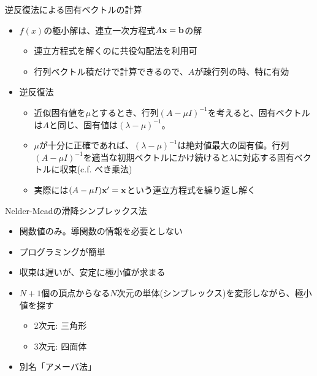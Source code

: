 \documentclass[dvipdfmx]{beamer}
\begin{document}
\begin{frame}[t,fragile]{逆反復法による固有ベクトルの計算}
  \begin{itemize}
    \setlength{\itemsep}{1em}
  \item $f(x)$の極小解は、連立一次方程式$A{\bf x} = {\bf b}$の解
    \begin{itemize}
    \item 連立方程式を解くのに共役勾配法を利用可
    \item 行列ベクトル積だけで計算できるので、$A$が疎行列の時、特に有効
    \end{itemize}
  \item 逆反復法
    \begin{itemize}
    \item 近似固有値を$\mu$とするとき、行列$(A - \mu I)^{-1}$を考えると、固有ベクトルは$A$と同じ、固有値は$(\lambda-\mu)^{-1}$。
    \item $\mu$が十分に正確であれば、$(\lambda-\mu)^{-1}$は絶対値最大の固有値。行列$(A - \mu I)^{-1}$を適当な初期ベクトルにかけ続けると$\lambda$に対応する固有ベクトルに収束(c.f. べき乗法)
    \item 実際には$(A-\mu I) {\bf x}' = {\bf x}$という連立方程式を繰り返し解く
    \end{itemize}
  \end{itemize}
\end{frame}

\begin{frame}[t,fragile]{Nelder-Meadの滑降シンプレックス法}
  \begin{itemize}
    \setlength{\itemsep}{1em}
  \item 関数値のみ。導関数の情報を必要としない
  \item プログラミングが簡単
  \item 収束は遅いが、安定に極小値が求まる
  \item $N+1$個の頂点からなる$N$次元の単体(シンプレックス)を変形しながら、極小値を探す
    \begin{itemize}
    \item 2次元: 三角形
    \item 3次元: 四面体
    \end{itemize}
  \item 別名「アメーバ法」
  \end{itemize}
\end{frame}
\end{document}
